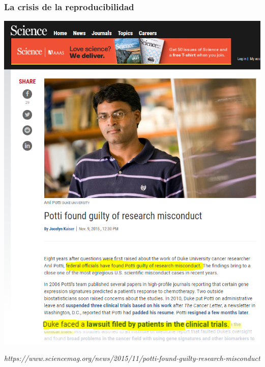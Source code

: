 \documentclass[9pt]{beamer}
\begin{document}
\begin{frame}
  \frametitle{La crisis de la reproducibilidad}
  \begin{center}
    \includegraphics[height=0.85\textheight]{images/potti_portada_5}
  \end{center}
  \hfill\begin{minipage}[h]{0.8\linewidth}
    {\tiny \textit{https://www.sciencemag.org/news/2015/11/potti-found-guilty-research-misconduct}}
  \end{minipage}
\end{frame}
\end{document}
